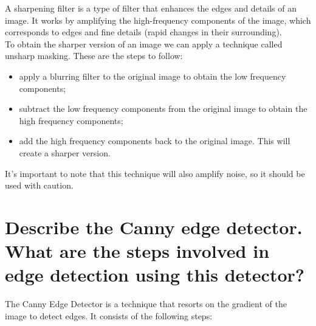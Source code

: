\documentclass{article}
\begin{document}
A sharpening filter is a type of filter that enhances the edges and details of an image. It works by amplifying the high-frequency components of the image, which corresponds to edges and fine details (rapid changes in their surrounding). \\

To obtain the sharper version of an image we can apply a technique called unsharp masking. These are the steps to follow:

\begin{itemize}
    \item apply a blurring filter to the original image to obtain the low frequency components;
    \item subtract the low frequency components from the original image to obtain the high frequency components;
    \item add the high frequency components back to the original image. This will create a sharper version.
\end{itemize}

It's important to note that this technique will also amplify noise, so it should be used with caution.

\newpage

\section*{Describe the Canny edge detector. What are the steps involved in edge detection using this detector?}

The Canny Edge Detector is a technique that resorts on the gradient of the image to detect edges. It consists of the following steps:
\end{document}
